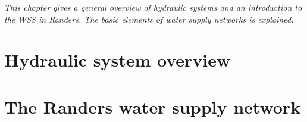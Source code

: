 \emph{This chapter gives a general overview of hydraulic systems and an introduction to the WSS in Randers. The basic elements of water supply networks is explained.  }

\section{Hydraulic system overview}
\label{hydraulic_system_overview}



\section{The Randers water supply network}
\label{the_randers_water_supply_network}